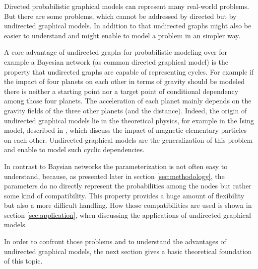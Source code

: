 Directed probabilistic graphical models can represent many real-world problems. But there are some problems, which cannot be addressed by directed but by undirected graphical models. In addition to that undirected graphs might also be easier to understand and might enable to model a problem in an simpler way.

A core advantage of undirected graphs for probabilistic modeling over for example a Bayesian network (as common directed graphical model) is the property that undirected graphs are capable of representing cycles. For example if the impact of four planets on each other in terms of gravity should be modeled there is neither a starting point nor a target point of conditional dependency among those four planets. The acceleration of each planet mainly depends on the gravity fields of the three other planets (and the distance). Indeed, the origin of undirected graphical models lie in the theoretical physics, for example in the Ising model, described in \cite{ising1925beitrag}, which discuss the impact of magnetic elementary particles on each other. Undirected graphical models are the generalization of this problem and enable to model such cyclic dependencies.

In contrast to Baysian networks the parameterization is not often easy to understand, because, as presented later in section \ref{sec:methodology}, the parameters do no directly represent the probabilities among the nodes but rather some kind of compatibility. This property provides a huge amount of flexibility but also a more difficult handling. How those compatibilities are used is shown in section \ref{sec:application}, when discussing the applications of undirected graphical models. 

In order to confront those problems and to understand the advantages of undirected graphical models, the next section gives a basic theoretical foundation of this topic.
